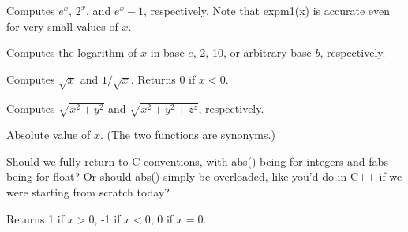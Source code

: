 \documentclass[11pt,letterpaper]{book}
\begin{document}
  
Computes $e^x$, $2^x$, and $e^x-1$, respectively.  Note that 
{\cf expm1(x)} is accurate even for very small values of $x$.
\apiend

  
Computes the logarithm of $x$ in base $e$, 2, 10, or arbitrary base $b$,
respectively.
\apiend

 
Computes $\sqrt{x}$ and $1/\sqrt{x}$.  Returns 0 if $x<0$.
\apiend

Computes $\sqrt{x^2+y^2}$ and $\sqrt{x^2+y^2+z^z}$, respectively.
\apiend

 
Absolute value of $x$.  (The two functions are synonyms.)
\apiend

\begin{annotate}
Should we fully return to C conventions, with abs() being for integers
and fabs being for float?  Or should abs() simply be overloaded, like
you'd do in C++ if we were starting from scratch today?
\end{annotate}

Returns 1 if $x>0$, -1 if $x<0$, 0 if $x=0$.
\apiend

   
\end{document}
